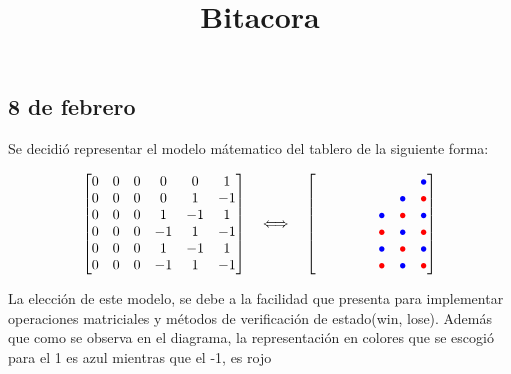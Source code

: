 \documentclass[12pt,a4paper]{article}
\title{Bitacora}
\date{}
\begin{document}
 
\maketitle


\subsection{8 de febrero}

Se decidió representar el modelo mátematico del tablero de la siguiente forma:



\[
\begin{bmatrix}
0 & 0 & 0 & 0 &  0 &  1 \\
0 & 0 & 0 & 0 &  1 & -1 \\
0 & 0 & 0 &  1 & -1 &  1 \\
0 & 0 & 0 & -1 &  1 & -1 \\
0 & 0 & 0 &  1 & -1 &  1 \\
0 & 0 & 0 & -1 &  1 & -1
\end{bmatrix}
\quad \Longleftrightarrow \quad
\begin{bmatrix}
\phantom{\bullet} & \phantom{\bullet} & \phantom{\bullet} & \phantom{\bullet} & \phantom{\bullet} & \textcolor{blue}{\bullet} \\
\phantom{\bullet} & \phantom{\bullet} & \phantom{\bullet} & \phantom{\bullet} & \textcolor{blue}{\bullet} & \textcolor{red}{\bullet} \\
\phantom{\bullet} & \phantom{\bullet} & \phantom{\bullet} & \textcolor{blue}{\bullet} & \textcolor{red}{\bullet} & \textcolor{blue}{\bullet} \\
\phantom{\bullet} & \phantom{\bullet} & \phantom{\bullet} & \textcolor{red}{\bullet} & \textcolor{blue}{\bullet} & \textcolor{red}{\bullet} \\
\phantom{\bullet} & \phantom{\bullet} & \phantom{\bullet} & \textcolor{blue}{\bullet} & \textcolor{red}{\bullet} & \textcolor{blue}{\bullet} \\
\phantom{\bullet} & \phantom{\bullet} & \phantom{\bullet} & \textcolor{red}{\bullet} & \textcolor{blue}{\bullet} & \textcolor{red}{\bullet}
\end{bmatrix}
\]

La elección de este modelo, se debe a la facilidad que presenta para implementar operaciones matriciales y métodos de verificación de estado(win, lose).
Además que como se observa en el diagrama, la representación en colores que se escogió para el 1 es azul mientras que el -1, es rojo
\end{document}

